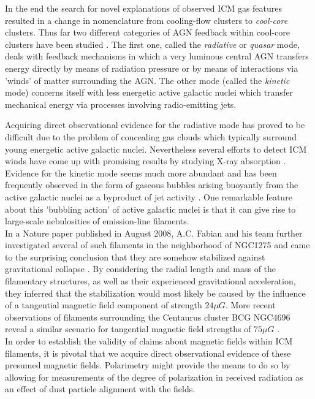 \documentclass[twoside,single]{lion-msc}
\begin{document}
    In the end the search for novel explanations of observed ICM gas features resulted in a change in nomenclature from cooling-flow clusters to \textit{cool-core} clusters. Thus far two different categories of AGN feedback within cool-core clusters have been studied \citep{Fabian2012}. The first one, called the \textit{radiative} or \textit{quasar} mode, deals with feedback mechanisms in which a very luminous central AGN transfers energy directly by means of radiation pressure or by means of interactions via 'winds' of matter surrounding the AGN. The other mode (called the \textit{kinetic} mode) concerns itself with less energetic active galactic nuclei which transfer mechanical energy via processes involving radio-emitting jets. \\ 
    
    \par Acquiring direct observational evidence for the radiative mode has proved to be difficult due to the problem of concealing gas clouds which typically surround young energetic active galactic nuclei. Nevertheless several efforts to detect ICM winds have come up with promising results by studying X-ray absorption \citep{Tombesi2011, Rupke2011}. Evidence for the kinetic mode seems much more abundant and has been frequently observed in the form of gaseous bubbles arising buoyantly from the active galactic nuclei as a byproduct of jet activity \citep{Churazov2000, Churazov2000a, McNamara2000}. One remarkable feature about this 'bubbling action' of active galactic nuclei is that it can give rise to large-scale nebulosities of emission-line filaments. \\
    In a Nature paper published in August 2008, A.C. Fabian and his team further investigated several of such filaments in the neighborhood of NGC1275 and came to the surprising conclusion that they are somehow stabilized against gravitational collapse \citep{Fabian2008}. By considering the radial length and mass of the filamentary structures, as well as their experienced gravitational acceleration, they inferred that the stabilization would most likely be caused by the influence of a tangential magnetic field component of strength $24 \mu G$. More recent observations of filaments surrounding the Centaurus cluster BCG NGC4696 reveal a similar scenario for tangential magnetic field strengths of $75 \mu G$ \citep{Fabian2016}.\\
    In order to establish the validity of claims about magnetic fields within ICM filaments, it is pivotal that we acquire direct observational evidence of these presumed magnetic fields. Polarimetry might provide the means to do so by allowing for measurements of the degree of polarization in received radiation as an effect of dust particle alignment with the fields.
    
\end{document}
